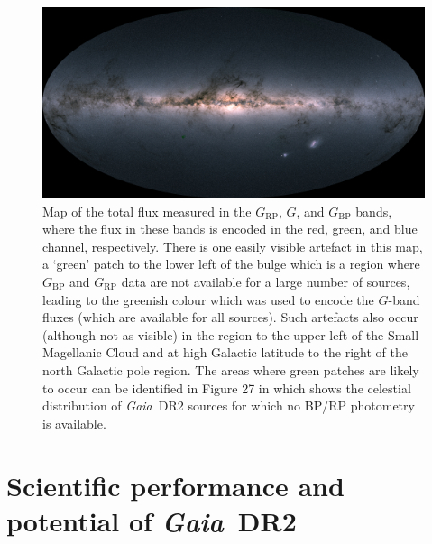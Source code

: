 \documentclass[longauth]{aa_gaia} %
\newcommand\gaia{\textit{Gaia}}
\newcommand\gdr[1]{\gaia~DR#1}
\newcommand\gbp{\ensuremath{G_\mathrm{BP}}}
\newcommand\grp{\ensuremath{G_\mathrm{RP}}}
\begin{document}
\begin{figure}[t]
  \includegraphics[width=\textwidth]{figures/GaiaDR2_sky_fluxRGB.png}
  \caption{Map of the total flux measured in the {\grp}, $G$, and {\gbp} bands, where the flux in
  these bands is encoded in the red, green, and blue channel, respectively. There is one easily visible
  artefact in this map, a `green' patch to the lower left of the bulge which is a region where
  {\gbp} and {\grp} data are not available for a large number of sources, leading to the greenish
  colour which was used to encode the $G$-band fluxes (which are available for all sources). Such
  artefacts also occur (although not as visible) in the region to the upper left of the Small
  Magellanic Cloud and at high Galactic latitude to the right of the north Galactic pole region. The
  areas where green patches are likely to occur can be identified in Figure 27 in
  \cite{DR2-DPACP-40} which shows the celestial distribution of \gdr{2} sources for which no BP/RP
  photometry is available.\label{fig:mwcolours}}
\end{figure}

%
%

\section{Scientific performance and potential of \gdr{2}}
\label{sec:sciencedemos}
\end{document}
